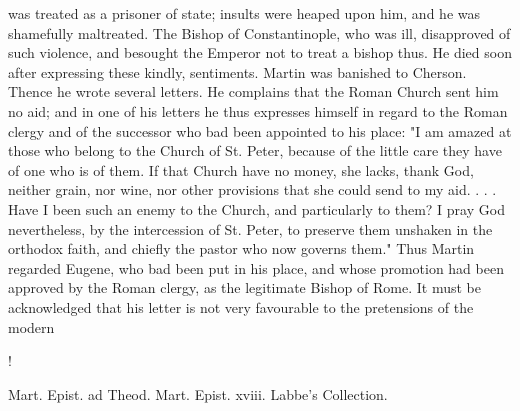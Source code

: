 was treated as a prisoner of state; insults were heaped upon him, and he was shamefully maltreated. The Bishop of Constantinople, who was ill, disapproved of such violence, and besought the Emperor not to treat a bishop thus. He died soon after expressing these kindly, sentiments. Martin was banished to Cherson. Thence he wrote several letters. He complains that the Roman Church sent him no aid; and in one of his letters he thus expresses himself in regard to the Roman clergy and of the successor who bad been appointed to his place: "I am amazed at those who belong to the Church of St. Peter, because of the little care they have of one who is of them. If that Church have no money, she lacks, thank God, neither grain, nor wine, nor other provisions that she could send to my aid. . . . Have I been such an enemy to the Church, and particularly to them? I pray God nevertheless, by the intercession of St. Peter, to preserve them unshaken in the orthodox faith, and chiefly the pastor who now governs them." Thus Martin regarded Eugene, who bad been put in his place, and whose promotion had been approved by the Roman clergy, as the legitimate Bishop of Rome. It must be acknowledged that his letter is not very favourable to the pretensions of the modern

!

Mart. Epist. ad Theod. Mart. Epist. xviii. Labbe’s Collection.


